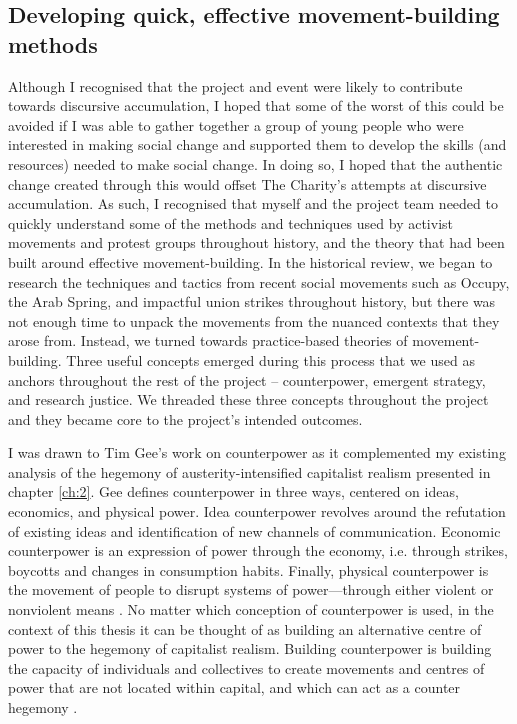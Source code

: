 \subsection{Developing quick, effective movement-building methods}
Although I recognised that the project and event were likely to contribute towards discursive accumulation, I hoped that some of the worst of this could be avoided if I was able to gather together a group of young people who were interested in making social change and supported them to develop the skills (and resources) needed to make social change. In doing so, I hoped that the authentic change created through this would offset The Charity's attempts at discursive accumulation. As such, I recognised that myself and the project team needed to quickly understand some of the methods and techniques used by activist movements and protest groups throughout history, and the theory that had been built around effective movement-building. In the historical review, we began to research the techniques and tactics from recent social movements such as Occupy, the Arab Spring, and impactful union strikes throughout history, but there was not enough time to unpack the movements from the nuanced contexts that they arose from. Instead, we turned towards practice-based theories of movement-building. Three useful concepts emerged during this process that we used as anchors throughout the rest of the project – counterpower, emergent strategy, and research justice. We threaded these three concepts throughout the project and they became core to the project's intended outcomes. 

I was drawn to Tim Gee’s work on counterpower \citep{gee_counterpower_2011} as it complemented my existing analysis of the hegemony of austerity-intensified capitalist realism presented in chapter \ref{ch:2}.  Gee defines counterpower in three ways, centered on ideas, economics, and physical power. Idea counterpower revolves around the refutation of existing ideas and identification of new channels of communication. Economic counterpower is an expression of power through the economy, i.e. through strikes, boycotts and changes in consumption habits. Finally, physical counterpower is the movement of people to disrupt systems of power—through either violent or nonviolent means \citep[p. 13]{gee_counterpower_2011}. No matter which conception of counterpower is used, in the context of this thesis it can be thought of as building an alternative centre of power to the hegemony of capitalist realism. Building counterpower is building the capacity of individuals and collectives to create movements and centres of power that are not located within capital, and which can act as a counter hegemony \citep[p. 19]{gee_counterpower_2011}. 

